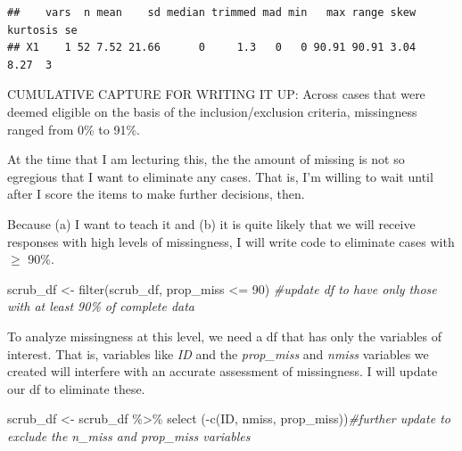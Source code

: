 \documentclass[
]{book}
\newenvironment{Shaded}{\begin{snugshade}}{\end{snugshade}}
\newcommand{\CommentTok}[1]{\textcolor[rgb]{0.56,0.35,0.01}{\textit{#1}}}
\newcommand{\DecValTok}[1]{\textcolor[rgb]{0.00,0.00,0.81}{#1}}
\newcommand{\FunctionTok}[1]{\textcolor[rgb]{0.00,0.00,0.00}{#1}}
\newcommand{\NormalTok}[1]{#1}
\newcommand{\OtherTok}[1]{\textcolor[rgb]{0.56,0.35,0.01}{#1}}
\newcommand{\SpecialCharTok}[1]{\textcolor[rgb]{0.00,0.00,0.00}{#1}}
\begin{document}
\begin{verbatim}
##    vars  n mean    sd median trimmed mad min   max range skew kurtosis se
## X1    1 52 7.52 21.66      0     1.3   0   0 90.91 90.91 3.04     8.27  3
\end{verbatim}

\begin{Shaded}
\end{Shaded}

CUMULATIVE CAPTURE FOR WRITING IT UP: Across cases that were deemed eligible on the basis of the inclusion/exclusion criteria, missingness ranged from 0\% to 91\%.

At the time that I am lecturing this, the the amount of missing is not so egregious that I want to eliminate any cases. That is, I'm willing to wait until after I score the items to make further decisions, then.

Because (a) I want to teach it and (b) it is quite likely that we will receive responses with high levels of missingness, I will write code to eliminate cases with \(\geq\) 90\%.

\begin{Shaded}
\begin{Highlighting}[]
\NormalTok{scrub\_df }\OtherTok{\textless{}{-}} \FunctionTok{filter}\NormalTok{(scrub\_df, prop\_miss }\SpecialCharTok{\textless{}=} \DecValTok{90}\NormalTok{)  }\CommentTok{\#update df to have only those with at least 90\% of complete data}
\end{Highlighting}
\end{Shaded}

To analyze missingness at this level, we need a df that has only the variables of interest. That is, variables like \emph{ID} and the \emph{prop\_miss} and \emph{nmiss} variables we created will interfere with an accurate assessment of missingness. I will update our df to eliminate these.

\begin{Shaded}
\begin{Highlighting}[]
\NormalTok{scrub\_df }\OtherTok{\textless{}{-}}\NormalTok{ scrub\_df }\SpecialCharTok{\%\textgreater{}\%}
  \FunctionTok{select}\NormalTok{ (}\SpecialCharTok{{-}}\FunctionTok{c}\NormalTok{(ID, nmiss, prop\_miss))}\CommentTok{\#further update to exclude the n\_miss and prop\_miss variables}
\end{Highlighting}
\end{Shaded}
\end{document}
